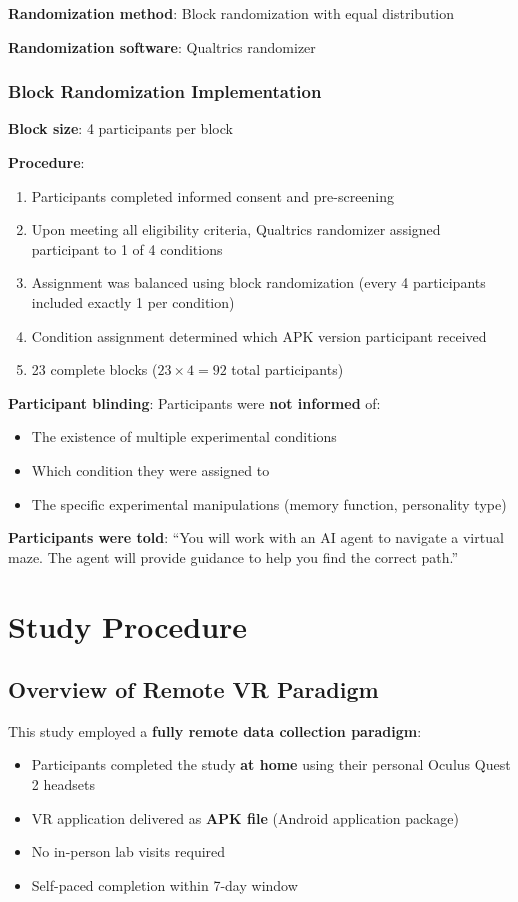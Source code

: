 \documentclass[12pt]{article}
\begin{document}
\textbf{Randomization method}: Block randomization with equal distribution

\textbf{Randomization software}: Qualtrics randomizer

\subsubsection{Block Randomization Implementation}

\textbf{Block size}: 4 participants per block

\textbf{Procedure}:
\begin{enumerate}
    \item Participants completed informed consent and pre-screening
    \item Upon meeting all eligibility criteria, Qualtrics randomizer assigned participant to 1 of 4 conditions
    \item Assignment was balanced using block randomization (every 4 participants included exactly 1 per condition)
    \item Condition assignment determined which APK version participant received
    \item 23 complete blocks ($23 \times 4 = 92$ total participants)
\end{enumerate}

\textbf{Participant blinding}: Participants were \textbf{not informed} of:
\begin{itemize}
    \item The existence of multiple experimental conditions
    \item Which condition they were assigned to
    \item The specific experimental manipulations (memory function, personality type)
\end{itemize}

\textbf{Participants were told}: ``You will work with an AI agent to navigate a virtual maze. The agent will provide guidance to help you find the correct path.''

\section{Study Procedure}

\subsection{Overview of Remote VR Paradigm}

This study employed a \textbf{fully remote data collection paradigm}:
\begin{itemize}
    \item Participants completed the study \textbf{at home} using their personal Oculus Quest 2 headsets
    \item VR application delivered as \textbf{APK file} (Android application package)
    \item No in-person lab visits required
    \item Self-paced completion within 7-day window
\end{itemize}
\end{document}
